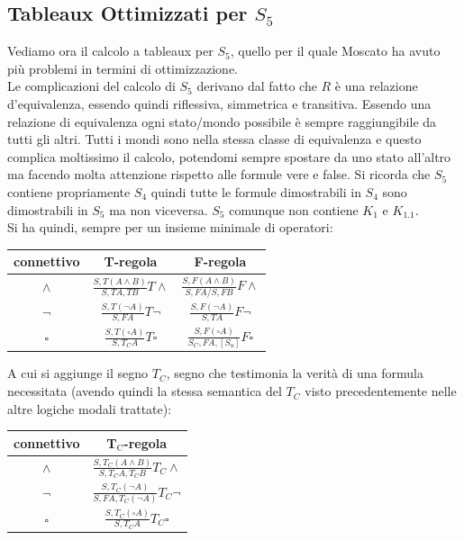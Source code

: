 \documentclass[a4paper,12pt, oneside]{book}
\begin{document}
\subsection{Tableaux Ottimizzati per $S_5$}
Vediamo ora il calcolo a tableaux per $S_5$, quello per il quale Moscato ha
avuto più problemi in termini di ottimizzazione.\\
Le complicazioni del calcolo di $S_5$ derivano dal fatto che $R$ è una relazione
d'equivalenza, essendo quindi riflessiva, simmetrica e transitiva. Essendo una
relazione di equivalenza ogni stato/mondo possibile è sempre raggiungibile da
tutti gli altri. Tutti i mondi sono nella stessa classe di equivalenza e questo
complica moltissimo il calcolo, potendomi sempre spostare da uno stato all'altro
ma facendo molta attenzione rispetto alle formule vere e false. Si ricorda che
$S_5$ contiene propriamente $S_4$ quindi tutte le formule dimostrabili in $S_4$
sono dimostrabili in $S_5$ ma non viceversa. $S_5$ comunque non contiene $K_1$ e
$K_{1.1}$.\\ 
Si ha quindi, sempre per un insieme minimale di operatori:
\begin{table}[H]
  \Large
  \centering
  \begin{tabular}{c||c|c}
    connettivo& T-regola& F-regola\\
    \hline
    \hline
    $\land$ & $\frac{S,T(A\land B)}{S,TA,TB}T\land$&
                        $\frac{S,F(A\land B)}{S,FA/S,FB}F\land$\\
    \hline
    $\neg$ & $\frac{S,T(\neg A)}{S,FA}T\neg$&
                        $\frac{S,F(\neg A)}{S,TA}F\neg$\\
    \hline
    $\square$ & $\frac{S,T(\square A)}{S,T_CA}T\square$&
             $\frac{S,F(\square A)}{S_C,FA,[S_u]}F\square$\\
  \end{tabular}
\end{table}
\noindent
A cui si aggiunge il segno $T_C$, segno che testimonia la verità di una formula
necessitata (avendo quindi la stessa semantica del $T_C$ visto precedentemente
nelle altre logiche modali trattate): 
\begin{table}[H]
  \Large
  \centering
  \begin{tabular}{c||c}
    connettivo& T$_{\mbox{C}}$-regola\\
    \hline
    \hline
    $\land$ & $\frac{S,T_C(A\land B)}{S,T_CA,T_CB}T_C\land$\\
    \hline
    $\neg$ & $\frac{S,T_C(\neg A)}{S,FA,T_C(\neg A)}T_C\neg$\\
    \hline
    $\square$ & $\frac{S,T_C(\square A)}{S,T_CA}T_C\square$
  \end{tabular}
\end{table}
\end{document}
